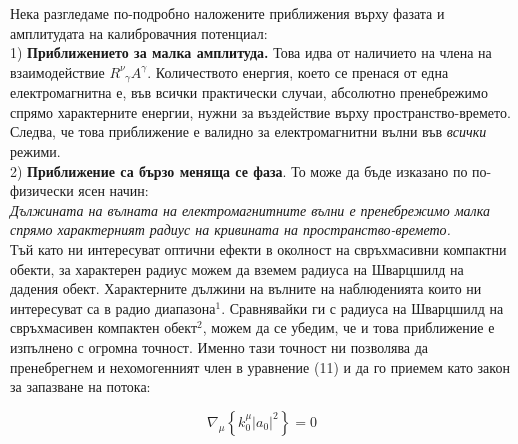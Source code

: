 Нека разгледаме по-подробно наложените приближения върху фазата и амплитудата на калибровачния потенциал:\\

1) \textbf{Приближението за малка амплитуда.} Това идва от наличието на члена на взаимодействие $R^\nu_{\,\,\,\gamma} A^\gamma$. Количеството енергия, което се пренася от една електромагнитна е, във всички практически случаи, абсолютно пренебрежимо спрямо характерните енергии, нужни за въздействие върху пространство-времето. Следва, че това приближение е валидно за електромагнитни вълни във \emph{всички} режими.\\

2) \textbf{Приближение са бързо меняща се фаза}. То може да бъде изказано по по-физически ясен начин:\\

\emph{Дължината на вълната на електромагнитните вълни е пренебрежимо малка спрямо характерният радиус на кривината на пространство-времето.}\\

Тъй като ни интересуват оптични ефекти в околност на свръхмасивни компактни обекти, за характерен радиус можем да вземем радиуса на Шварцшилд на дадения обект. Характерните дължини на вълните на наблюденията които ни интересуват са в радио диапазона$^1$. Сравнявайки ги с радиуса на Шварцшилд на свръхмасивен компактен обект$^2$, можем да се убедим, че и това приближение е изпълнено с огромна точност. Именно тази точност ни позволява да пренебрегнем и нехомогенният член в уравнение (11) и да го приемем като закон за запазване на потока:

\begin{equation}
		\nabla_\mu\left\{k_0^\mu |a_0|^2\right\} = 0
\end{equation}

